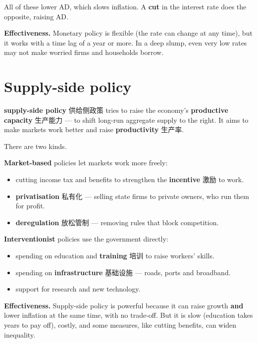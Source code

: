 \documentclass[11pt]{article}
\begin{document}
All of these lower AD, which slows inflation. A \textbf{cut} in the interest rate does the opposite, raising AD.

\textbf{Effectiveness.} Monetary policy is flexible (the rate can change at any time), but it works with a time lag of a year or more. In a deep slump, even very low rates may not make worried firms and households borrow.

\section*{Supply-side policy}

\textbf{supply-side policy} 供给侧政策 tries to raise the economy's \textbf{productive capacity} 生产能力 — to shift long-run aggregate supply to the right. It aims to make markets work better and raise \textbf{productivity} 生产率.

There are two kinds.

\textbf{Market-based} policies let markets work more freely:

\begin{itemize}
\item cutting income tax and benefits to strengthen the \textbf{incentive} 激励 to work.

\item \textbf{privatisation} 私有化 — selling state firms to private owners, who run them for profit.

\item \textbf{deregulation} 放松管制 — removing rules that block competition.

\end{itemize}

\textbf{Interventionist} policies use the government directly:

\begin{itemize}
\item spending on education and \textbf{training} 培训 to raise workers' skills.

\item spending on \textbf{infrastructure} 基础设施 — roads, ports and broadband.

\item support for research and new technology.

\end{itemize}

\textbf{Effectiveness.} Supply-side policy is powerful because it can raise growth \textbf{and} lower inflation at the same time, with no trade-off. But it is slow (education takes years to pay off), costly, and some measures, like cutting benefits, can widen inequality.
\end{document}
